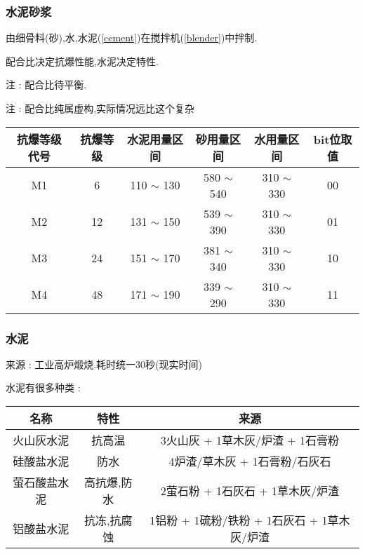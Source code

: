 {{      \subsubsection{水泥砂浆}{
          由细骨料(砂),水,水泥({\ref{cement}})在搅拌机({\ref{blender}})中拌制.

          配合比决定抗爆性能,水泥决定特性.

          注 : 配合比待平衡.

          注 : 配合比纯属虚构,实际情况远比这个复杂

          \begin{center}
              \begin{tabular}{|c|c|c|c|c|c|}
                  \hline
                  抗爆等级代号 & 抗爆等级 & 水泥用量区间   & 砂用量区间     & 水用量区间     & bit位取值 \\
                  \hline
                  M1           & 6        & 110 $\sim$ 130 & 580 $\sim$ 540 & 310 $\sim$ 330 & 00        \\
                  \hline
                  M2           & 12       & 131 $\sim$ 150 & 539 $\sim$ 390 & 310 $\sim$ 330 & 01        \\
                  \hline
                  M3           & 24       & 151 $\sim$ 170 & 381 $\sim$ 340 & 310 $\sim$ 330 & 10        \\
                  \hline
                  M4           & 48       & 171 $\sim$ 190 & 339 $\sim$ 290 & 310 $\sim$ 330 & 11        \\
                  \hline
              \end{tabular}
          \end{center}
      }\label{cement_mortar}

      \subsubsection{水泥}{
          来源 : 工业高炉煅烧.耗时统一30秒(现实时间)

          水泥有很多种类 :

          \begin{center}
              \begin{tabular}{|c|c|c|}
                  \hline
                  名称         & 特性        & 来源                                        \\
                  \hline
                  火山灰水泥   & 抗高温      & 3火山灰 + 1草木灰/炉渣 + 1石膏粉            \\
                  \hline
                  硅酸盐水泥   & 防水        & 4炉渣/草木灰 + 1石膏粉/石灰石               \\
                  \hline
                  萤石酸盐水泥 & 高抗爆,防水 & 2萤石粉 + 1石灰石 + 1草木灰/炉渣            \\
                  \hline
                  铝酸盐水泥   & 抗冻,抗腐蚀 & 1铝粉 + 1硫粉/铁粉 + 1石灰石 + 1草木灰/炉渣 \\
                  \hline
              \end{tabular}
          \end{center}

}}}

